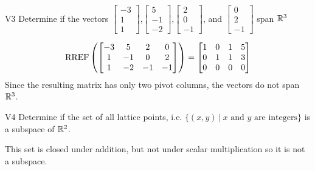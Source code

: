 \documentclass{sbgLAexam}
\begin{document}
\begin{extract}\newpage\end{extract}
\begin{problem}{V3}
Determine if the vectors  $\begin{bmatrix} -3 \\ 1 \\ 1 \end{bmatrix}$,$\begin{bmatrix} 5 \\ -1 \\ -2 \end{bmatrix}$,$\begin{bmatrix}2 \\ 0 \\ -1 \end{bmatrix}$, and $\begin{bmatrix} 0 \\ 2 \\ -1\end{bmatrix}$ span $\mathbb{R}^3$
\end{problem}
\begin{solution}
$$\operatorname{RREF}\left(\begin{bmatrix}
-3 & 5 & 2 & 0 \\ 1 & -1 & 0 & 2 \\ 1 & -2 & -1 & -1 \end{bmatrix}\right)=\begin{bmatrix} 1 & 0 & 1 & 5 \\ 0 & 1 & 1 & 3 \\ 0 & 0 & 0 & 0\end{bmatrix}$$
Since the resulting matrix has only two pivot columns, the vectors do not span $\mathbb{R}^3$.
\end{solution}


\begin{problem}{V4}
Determine if the set of all lattice points, i.e. $\{(x,y)\ \big|\ \text{$x$ and $y$ are integers} \}$ is a subspace of $\mathbb{R}^2$.
\end{problem}
\begin{solution}
This set is closed under addition, but not under scalar multiplication so it is not a subspace.
\end{solution}
\end{document}
